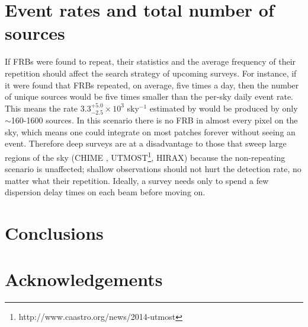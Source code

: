 \documentclass[useAMS,usenatbib]{mn2e}
\begin{document}
\section{Event rates and total number of sources}
\label{rate}

If FRBs were found to repeat, their statistics and the
average frequency of their repetition 
should affect the search strategy of upcoming surveys. 
For instance, if it were found that FRBs repeated,
on average, five times a day, then the number of unique 
sources would be five times smaller than the per-sky 
daily event rate. This means the rate 
$3.3^{+5.0}_{-2.5}\times10^3$ sky$^{-1}$ estimated by 
\cite{2015arXiv150500834R} would be produced by
only $\sim$160-1600 sources. In this scenario 
there is no FRB in almost every pixel on the sky, which means
one could integrate on most patches forever without 
seeing an event. Therefore deep surveys are at a disadvantage 
to those that sweep large regions of the sky 
(CHIME  \citep{2014SPIE.9145E..22B}, 
UTMOST\footnote{http://www.caastro.org/news/2014-utmost}, HIRAX)
because the non-repeating 
scenario is unaffected; shallow observations 
should not hurt the detection rate, no matter what their repetition. 
Ideally, a survey
needs only to spend a few dispersion delay times on each beam 
before moving on. 


\section{Conclusions}



\section{Acknowledgements}


\newcommand{\araa}{ARA\&A}   %
\newcommand{\afz}{Afz}       %
\newcommand{\aj}{AJ}         %
\newcommand{\azh}{AZh}       %
\newcommand{\aaa}{A\&A}      %
\newcommand{\aas}{A\&AS}     %
\newcommand{\aar}{A\&AR}     %
\newcommand{\apj}{ApJ}       %
\newcommand{\apjs}{ApJS}     %
\newcommand{\apjl}{ApJ}      %
\newcommand{\apss}{Ap\&SS}   %
\newcommand{\baas}{BAAS}     %
\newcommand{\jaa}{JA\&A}     %
\newcommand{\mnras}{MNRAS}   %
\newcommand{\nat}{Nat}       %
\newcommand{\pasj}{PASJ}     %
\newcommand{\pasp}{PASP}     %
\newcommand{\paspc}{PASPC}   %
\newcommand{\qjras}{QJRAS}   %
\newcommand{\sci}{Sci}       %
\newcommand{\solphys}{Solar Physics}       %
\newcommand{\sova}{SvA}      %
\newcommand{\aap}{A\&A}
\newcommand\jcap{{J. Cosmology Astropart. Phys.}}%
\newcommand{\prd}{Phys. Rev. D}

%




\label{lastpage}
\end{document}

